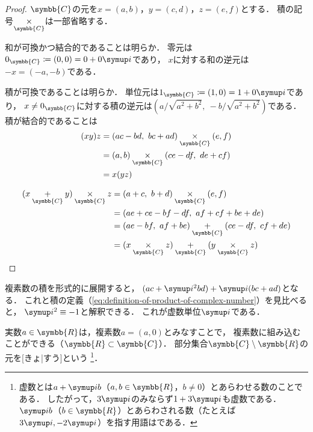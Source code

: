 \documentclass[../sotsu.tex]{subfiles}
\begin{document}
\begin{proof}
    $\symbb{C}$の元を$x = (a, b)$，$y = (c, d)$，$z = (e, f)$とする．
    積の記号$\underset{\symbb{C}}{\times}$は一部省略する．

    \quad
    和が可換かつ結合的であることは明らか．
    零元は$0_{\symbb{C}} \coloneq (0, 0) = 0 + 0\iu$であり，
    $x$に対する和の逆元は$-x = (-a, -b)$である．

    \quad
    積が可換であることは明らか．
    単位元は$1_{\symbb{C}} \coloneq (1, 0) = 1 + 0\iu$であり，
    $x \neq 0_{\symbb{C}}$に対する積の逆元は$(a / \sqrt{a^2 + b^2}, \  -b / \sqrt{a^2 + b^2} )$である．
    積が結合的であることは
    \begin{equation*}
        \begin{split}
            (xy)z &= (ac-bd, \  bc+ad) \underset{\symbb{C}}{\times} (e, f)   \\
                  &= (a, b) \underset{\symbb{C}}{\times} (ce-df, \  de+cf)   \\
                  &= x(yz)
        \end{split}
    \end{equation*}

    \quad
    \begin{equation*}
        \begin{split}
            (x \underset{\symbb{C}}{+} y) \underset{\symbb{C}}{\times} z
            &= (a+c, \  b+d) \underset{\symbb{C}}{\times} (e, f)   \\ 
            &= (ae+ce-bf-df, \  af+cf+be+de)   \\
            &= (ae-bf, \  af+be) \underset{\symbb{C}}{+} (ce-df, \  cf+de)   \\
            &= (x \underset{\symbb{C}}{\times} z) \underset{\symbb{C}}{+}
               (y \underset{\symbb{C}}{\times} z)
        \end{split}
    \end{equation*}
\end{proof}

複素数の積を形式的に展開すると，
$(ac + \iu^2 bd) + \iu (bc + ad)$となる．
これと積の定義（\cref{eq:definition-of-product-of-complex-number}）を見比べると，
$\iu^2 \equiv -1$と解釈できる．
これが虚数単位$\iu$である．

実数$a \in \symbb{R}$は，複素数$a = (a, 0)$とみなすことで，
複素数に組み込むことができる（$\symbb{R} \subset \symbb{C}$）．
部分集合$\symbb{C} \setminus \symbb{R}$の元を[きょ|すう]という%
\footnote{
    虚数とは$a + \iu b$（$a, b \in \symbb{R}$，$b \neq 0$）とあらわせる数のことである．
    したがって，$3\iu$のみならず$1 + 3\iu$も虚数である．
    $\iu b$（$b \in \symbb{R}$）とあらわされる数（たとえば$3\iu, -2\iu$）を指す用語はである．
}．
\end{document}
